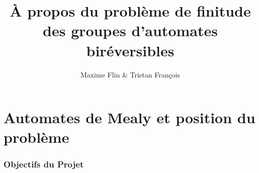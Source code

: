 \documentclass[11pt]{beamer}
\begin{document}
	\author{Maxime Flin  \& Tristan François}
	\title{\`A propos du problème de finitude des groupes d'automates biréversibles}
	\begin{frame}[plain]
		\maketitle
	\end{frame}
	
	\section{Automates de Mealy et position du problème}
	
	\begin{frame}
		\frametitle{Objectifs du Projet}
	\end{frame}
\end{document}
